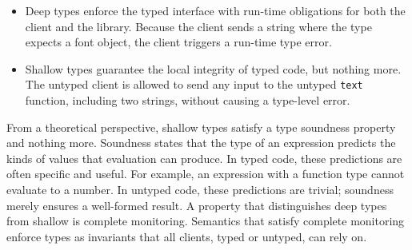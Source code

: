 \documentclass[screen=true, natbib=false, 10pt, sigplan]{acmart}
\newcommand{\Scribtexttt}[1]{{\texttt{#1}}}
\newlength{\stabLeft}
\newcommand{\atItemizeStart}[0]{\addtolength{\stabLeft}{\labelsep}
                                \addtolength{\stabLeft}{\labelwidth}}
\begin{document}
\noindent \begin{itemize}\atItemizeStart

\item Deep types enforce the typed interface with run{-}time obligations for both
the client and the library.
Because the client sends a string where the type expects a font object,
the client triggers a run{-}time type error.

\item Shallow types guarantee the local integrity of typed code, but nothing more.
The untyped client is allowed to send any input to the untyped \Scribtexttt{text}
function, including two strings, without causing a type{-}level error.\end{itemize}

From a theoretical perspective, shallow types satisfy a type soundness
property and nothing more.
Soundness states that the type of an expression predicts the kinds of values
that evaluation can produce.
In typed code, these predictions are often specific and useful.
For example, an expression with a function type cannot evaluate to a number.
In untyped code, these predictions are trivial;
 soundness merely ensures a well{-}formed result.
A property that distinguishes deep types from shallow is
complete monitoring.
Semantics that satisfy complete monitoring enforce types as invariants
that all clients, typed or untyped, can rely on.
\end{document}
